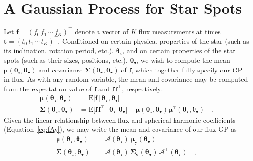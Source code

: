 \documentclass[modern]{aastex62}
\begin{document}
\section{A Gaussian Process for Star Spots}
\label{sec:gp}
%


Let
$\mathbf{f} = \left( f_0 \, f_1 \, \cdots \,  f_K \right)^\top$
denote a vector of $K$ flux measurements at times
$\mathbf{t} = \left( t_0 \,  t_1 \,  \cdots \, t_K \right)^\top$.
Conditioned on certain physical properties of the
star
(such as its inclination, rotation period, etc.), $\pmb{\theta}_\star$,
and on certain properties of the  star spots
(such as their sizes, positions, etc.), $\pmb{\theta}_\bullet$,
we wish to compute the mean $\pmb{\mu}(\pmb{\theta}_\star, \pmb{\theta}_\bullet)$ and
covariance $\pmb{\Sigma}(\pmb{\theta}_\star, \pmb{\theta}_\bullet)$
of $\mathbf{f}$, which together fully specify our GP in flux.
%
As with any random variable, the mean and covariance may be computed from
the expectation value of $\mathbf{f}$ and
$\mathbf{f}\,\mathbf{f}^\top$, respectively:
%
\begin{align}
    \label{eq:mean}
    \pmb{\mu}(\pmb{\theta}_\star, \pmb{\theta}_\bullet)
     & = \mathrm{E} \Big[ \mathbf{f} \, \Big| \, \pmb{\theta}_\star, \pmb{\theta}_\bullet \Big]
    \\
    \label{eq:cov}
    \pmb{\Sigma}(\pmb{\theta}_\star, \pmb{\theta}_\bullet)
     & = \mathrm{E} \Big[ \mathbf{f} \, \mathbf{f}^\top \, \Big| \, \pmb{\theta}_\star, \pmb{\theta}_\bullet \Big] - \pmb{\mu}(\pmb{\theta}_\star, \pmb{\theta}_\bullet) \pmb{\mu}^\top(\pmb{\theta}_\star, \pmb{\theta}_\bullet)
    \quad.
\end{align}
%
Given the linear relationship between flux and spherical harmonic
coefficients (Equation~\ref{eq:fAy}),
we may write the mean and covariance of our flux GP as
%
\begin{align}
    \label{eq:mean_f}
    \pmb{\mu}(\pmb{\theta}_\star, \pmb{\theta}_\bullet)
     & = \pmb{\mathcal{A}}(\pmb{\theta}_\star) \, \pmb{\mu}_{\mathbf{y}}(\pmb{\theta}_\bullet)
    \\
    \label{eq:cov_f}
    \pmb{\Sigma}(\pmb{\theta}_\star, \pmb{\theta}_\bullet)
     & = \pmb{\mathcal{A}}(\pmb{\theta}_\star) \, \pmb{\Sigma}_{\mathbf{y}}(\pmb{\theta}_\bullet) \, \pmb{\mathcal{A}}^\top(\pmb{\theta}_\star)
    \quad,
\end{align}
\end{document}
